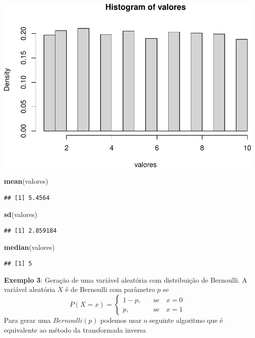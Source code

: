 \documentclass[
]{book}
\newenvironment{Shaded}{\begin{snugshade}}{\end{snugshade}}
\newcommand{\FunctionTok}[1]{\textcolor[rgb]{0.13,0.29,0.53}{\textbf{#1}}}
\newcommand{\NormalTok}[1]{#1}
\begin{document}
\includegraphics{introR_files/figure-latex/unnamed-chunk-286-1.pdf}

\begin{Shaded}
\begin{Highlighting}[]
\FunctionTok{mean}\NormalTok{(valores)}
\end{Highlighting}
\end{Shaded}

\begin{verbatim}
## [1] 5.4564
\end{verbatim}

\begin{Shaded}
\begin{Highlighting}[]
\FunctionTok{sd}\NormalTok{(valores)}
\end{Highlighting}
\end{Shaded}

\begin{verbatim}
## [1] 2.859184
\end{verbatim}

\begin{Shaded}
\begin{Highlighting}[]
\FunctionTok{median}\NormalTok{(valores)}
\end{Highlighting}
\end{Shaded}

\begin{verbatim}
## [1] 5
\end{verbatim}

\textbf{Exemplo 3}: Geração de uma variável aleatória com distribuição de
Bernoulli. A variável aleatória \(X\) é de Bernoulli com parâmetro \(p\) se
\[P(X = x) = \begin{cases} 1-p,& \quad \text{se} \quad x=0\\
p,& \quad \text{se} \quad x=1 \end{cases}\] Para gerar uma
\(Bernoulli(p)\) podemos usar o seguinte algoritmo que é equivalente ao
método da transformada inversa
\end{document}
